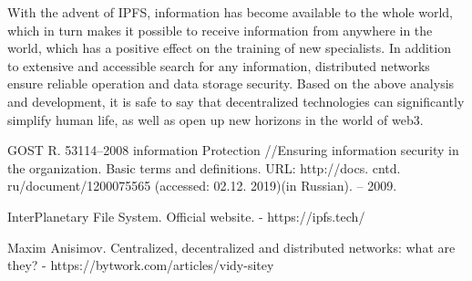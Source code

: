 \documentclass[10pt,conference,a4paper]{IEEEtran_EDM}
\begin{document}
With the advent of IPFS, information has become available to the whole world, which in turn makes it possible to receive information from anywhere in the world, which has a positive effect on the training of new specialists.
In addition to extensive and accessible search for any information, distributed networks ensure reliable operation and data storage security.
Based on the above analysis and development, it is safe to say that decentralized technologies can significantly simplify human life, as well as open up new horizons in the world of web3.

\begin{thebibliography}{00}

 GOST R. 53114–2008 information Protection //Ensuring information security in the organization. Basic terms and definitions. URL: http://docs. cntd. ru/document/1200075565 (accessed: 02.12. 2019)(in Russian). – 2009.

 InterPlanetary File System. Official website. - https://ipfs.tech/

 Maxim Anisimov. Centralized, decentralized and distributed networks: what are they? - https://bytwork.com/articles/vidy-sitey


\end{thebibliography}
\end{document}
